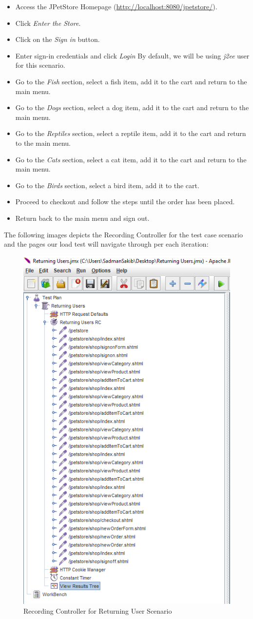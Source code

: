 \documentclass[fontsize=12pt,paper=letter,twoside]{scrartcl}
\begin{document}
\begin{itemize}
\item Access the JPetStore Homepage (\url{http://localhost:8080/jpetstore/}).
\item Click \emph{Enter the Store}.
\item Click on the \emph{Sign in} button.
\item Enter sign-in credentials and click \emph{Login} By default, we will be using \emph{j2ee} user for this scenario.
\item Go to the \emph{Fish} section, select a fish item, add it to the cart and return to the main menu.
\item Go to the \emph{Dogs} section, select a dog item, add it to the cart and return to the main menu.
\item Go to the \emph{Reptiles} section, select a reptile item, add it to the cart and return to the main menu.
\item Go to the \emph{Cats} section, select a cat item, add it to the cart and return to the main menu.
\item Go to the \emph{Birds} section, select a bird item, add it to the cart.
\item Proceed to checkout and follow the steps until the order has been placed.
\item Return back to the main menu and sign out.
\end{itemize}

\newpage
\bigskip
\noindent The following images depicts the Recording Controller for the test case scenario and the pages our load test will navigate through per each iteration:

\begin{figure}[!htb]
\begin{center}
\includegraphics[width=.6\textwidth]{../../load-test/test-plans/returning-user/rc.png}
\end{center}
\caption{Recording Controller for Returning User Scenario}
\label{fig:ruser:rc}
\end{figure}
\end{document}
